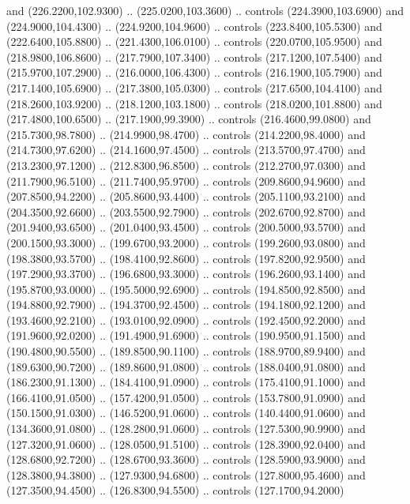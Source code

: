 {\begin{scope}[y=0.80pt, x=0.80pt, yscale=-1, xscale=1, inner sep=0pt, outer sep=0pt, #1]
      and (226.2200,102.9300) .. (225.0200,103.3600) .. controls (224.3900,103.6900)
      and (224.9000,104.4300) .. (224.9200,104.9600) .. controls (223.8400,105.5300)
      and (222.6400,105.8800) .. (221.4300,106.0100) .. controls (220.0700,105.9500)
      and (218.9800,106.8600) .. (217.7900,107.3400) .. controls (217.1200,107.5400)
      and (215.9700,107.2900) .. (216.0000,106.4300) .. controls (216.1900,105.7900)
      and (217.1400,105.6900) .. (217.3800,105.0300) .. controls (217.6500,104.4100)
      and (218.2600,103.9200) .. (218.1200,103.1800) .. controls (218.0200,101.8800)
      and (217.4800,100.6500) .. (217.1900,99.3900) .. controls (216.4600,99.0800)
      and (215.7300,98.7800) .. (214.9900,98.4700) .. controls (214.2200,98.4000)
      and (214.7300,97.6200) .. (214.1600,97.4500) .. controls (213.5700,97.4700)
      and (213.2300,97.1200) .. (212.8300,96.8500) .. controls (212.2700,97.0300)
      and (211.7900,96.5100) .. (211.7400,95.9700) .. controls (209.8600,94.9600)
      and (207.8500,94.2200) .. (205.8600,93.4400) .. controls (205.1100,93.2100)
      and (204.3500,92.6600) .. (203.5500,92.7900) .. controls (202.6700,92.8700)
      and (201.9400,93.6500) .. (201.0400,93.4500) .. controls (200.5000,93.5700)
      and (200.1500,93.3000) .. (199.6700,93.2000) .. controls (199.2600,93.0800)
      and (198.3800,93.5700) .. (198.4100,92.8600) .. controls (197.8200,92.9500)
      and (197.2900,93.3700) .. (196.6800,93.3000) .. controls (196.2600,93.1400)
      and (195.8700,93.0000) .. (195.5000,92.6900) .. controls (194.8500,92.8500)
      and (194.8800,92.7900) .. (194.3700,92.4500) .. controls (194.1800,92.1200)
      and (193.4600,92.2100) .. (193.0100,92.0900) .. controls (192.4500,92.2000)
      and (191.9600,92.0200) .. (191.4900,91.6900) .. controls (190.9500,91.1500)
      and (190.4800,90.5500) .. (189.8500,90.1100) .. controls (188.9700,89.9400)
      and (189.6300,90.7200) .. (189.8600,91.0800) .. controls (188.0400,91.0800)
      and (186.2300,91.1300) .. (184.4100,91.0900) .. controls (175.4100,91.1000)
      and (166.4100,91.0500) .. (157.4200,91.0500) .. controls (153.7800,91.0900)
      and (150.1500,91.0300) .. (146.5200,91.0600) .. controls (140.4400,91.0600)
      and (134.3600,91.0800) .. (128.2800,91.0600) .. controls (127.5300,90.9900)
      and (127.3200,91.0600) .. (128.0500,91.5100) .. controls (128.3900,92.0400)
      and (128.6800,92.7200) .. (128.6700,93.3600) .. controls (128.5900,93.9000)
      and (128.3800,94.3800) .. (127.9300,94.6800) .. controls (127.8000,95.4600)
      and (127.3500,94.4500) .. (126.8300,94.5500) .. controls (127.1700,94.2000)

\end{scope}}
